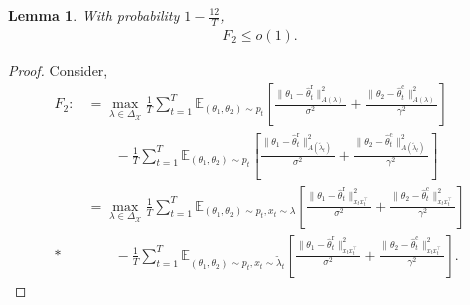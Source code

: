 \documentclass[accepted]{uai2025} %
\theoremstyle{plain}
\newtheorem{lemma}[theorem]{Lemma}
\theoremstyle{definition}
\theoremstyle{remark}
\newcommand{\hthetact}{\hat{\theta}_t^{\mathrm{c}}}
\newcommand{\hthetart}{\hat{\theta}_t^{\mathrm{r}}}
\begin{document}
\begin{lemma}
\label{lem:Regret_F2}
With probability $1-\frac{12}{T}$,
    \begin{align*}
        F_2\le o(1).
    \end{align*}
\end{lemma}
\begin{proof}
Consider,
    \begin{align*}
    F_2:&=\max_{\lambda \in \Delta_{\mathcal{X}}} \frac{1}{T} 
\sum_{t=1}^{T} \mathbb{E}_{(\theta_1, \theta_2) \sim p_t} 
\left[ \frac{\|\theta_1 - \hthetart\|_{A(\lambda)}^2}{\sigma^2} 
+ \frac{\|\theta_2 - \hthetact\|_{A(\lambda)}^2}{\gamma^2} \right] \\ 
&\qquad 
- \frac{1}{T} \sum_{t=1}^{T} \mathbb{E}_{(\theta_1, \theta_2) \sim p_t} 
\left[ \frac{\|\theta_1 - \hthetart\|_{A(\tilde{\lambda}_t)}^2}{\sigma^2} 
+ \frac{\|\theta_2 - \hthetact\|_{A(\tilde{\lambda}_t)}^2}{\gamma^2} \right] 
\\&=\max_{\lambda \in \Delta_{\mathcal{X}}} \frac{1}{T} 
\sum_{t=1}^{T} \mathbb{E}_{(\theta_1, \theta_2) \sim p_t, x_t\sim \lambda} 
\left[ \frac{\|\theta_1 - \hthetart\|_{x_t x_t^\top}^2}{\sigma^2} 
+ \frac{\|\theta_2 - \hthetact\|_{x_t x_t^\top}^2}{\gamma^2} \right] \\* 
&\qquad 
- \frac{1}{T} \sum_{t=1}^{T} \mathbb{E}_{(\theta_1, \theta_2) \sim p_t, x_t\sim \tilde{\lambda}_t} 
\left[ \frac{\|\theta_1 - \hthetart\|_{x_t x_t^\top}^2}{\sigma^2} 
+ \frac{\|\theta_2 - \hthetact\|_{x_t x_t^\top}^2}{\gamma^2} \right]. \nonumber
\end{align*}



\end{proof}
\end{document}
